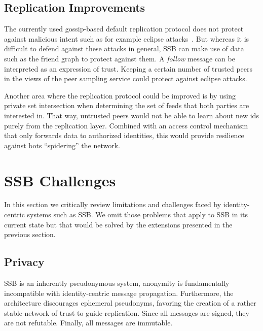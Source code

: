 \documentclass[9pt,sigconf,rewiew]{acmart}
\begin{document}
\subsection{Replication Improvements}

The currently used gossip-based default replication protocol does not protect against malicious intent such as for example eclipse attacks~\cite{singh2006eclipse}. But whereas it is difficult to defend against these attacks in general, SSB can make use of data such as the friend graph to protect against them. A \textit{follow} message can be interpreted as an expression of trust. Keeping a certain number of trusted peers in the views of the peer sampling service could protect against eclipse attacks.

Another area where the replication protocol could be improved is by using private set intersection when determining the set of feeds that both parties are interested in. That way, untrusted peers would not be able to learn about new ids purely from the replication layer. Combined with an access control mechanism that only forwards data to authorized identities, this would provide resilience against bots ``spidering'' the network.

%

\section{SSB Challenges}
\label{sect:nay}


In this section we critically review limitations and challenges faced by identity-centric systems such as SSB. We omit those problems that apply to SSB in its current state but that would be solved by the extensions presented in the previous section.

\subsection{Privacy}

SSB is an inherently pseudonymous system, anonymity is fundamentally incompatible with identity-centric message propagation. Furthermore, the architecture discourages ephemeral pseudonyms, favoring the creation of a rather stable network of trust to guide replication. Since all messages are signed, they are not refutable. Finally, all messages are immutable.
\end{document}
